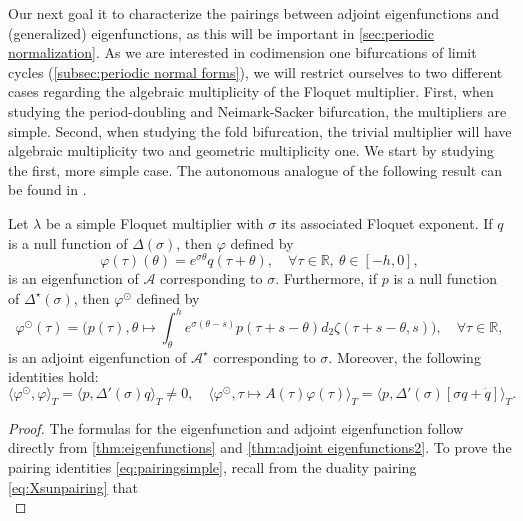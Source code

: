 \documentclass[english]{myarticle}
\begin{document}
\begin{sloppypar}
Our next goal it to characterize the pairings between adjoint eigenfunctions and (generalized) eigenfunctions, as this will be important in \cref{sec:periodic normalization}. As we are interested in codimension one bifurcations of limit cycles (\cref{subsec:periodic normal forms}), we will restrict ourselves to two different cases regarding the algebraic multiplicity of the Floquet multiplier. First, when studying the period-doubling and Neimark-Sacker bifurcation, the multipliers are simple. Second, when studying the fold bifurcation, the trivial multiplier will have algebraic multiplicity two and geometric multiplicity one. We start by studying the first, more simple case. The autonomous analogue of the following result can be found in \cite[Corollary IV.5.12]{Diekmann1995}.
\begin{proposition} \label{prop:pairing}
Let $\lambda$ be a simple Floquet multiplier with $\sigma$ its associated Floquet exponent. If $q$ is a null function of $\Delta(\sigma)$, then $\varphi$ defined by
\begin{equation} \label{eq:simple eig}
    \varphi(\tau)(\theta) = e^{\sigma\theta} q(\tau + \theta), \quad \forall \tau \in \mathbb{R}, \ \theta \in [-h,0],
\end{equation}
is an eigenfunction of $\mathcal{A}$ corresponding to $\sigma$. Furthermore, if $p$ is a null function of $\Delta^\star(\sigma)$, then $\varphi^\odot$ defined by
\begin{equation} \label{eq:adjointsimple}
    \varphi^\odot (\tau) = \bigg(p(\tau), \theta \mapsto \int_\theta^h e^{\sigma(\theta -s)}p(\tau + s - \theta) d_2 \zeta(\tau + s - \theta,s)\bigg), \quad \forall \tau \in \mathbb{R},
\end{equation}
is an adjoint eigenfunction of $\mathcal{A}^\star$ corresponding to $\sigma$. Moreover, the following identities hold:
\begin{equation} \label{eq:pairingsimple}
    \langle \varphi^\odot, \varphi \rangle_T = \langle p, \Delta'(\sigma) q \rangle_T \neq 0, \quad \langle \varphi^\odot, \tau \mapsto A(\tau)\varphi(\tau) \rangle_T = \langle p, \Delta'(\sigma)[\sigma q + \dot{q} ]\rangle_T.
\end{equation}
\begin{proof}
The formulas for the eigenfunction and adjoint eigenfunction follow directly from \cref{thm:eigenfunctions} and \cref{thm:adjoint eigenfunctions2}. To prove the pairing identities \eqref{eq:pairingsimple}, recall from the duality pairing \eqref{eq:Xsunpairing} that
\begin{equation} \label{eq:pairingcomp}

\end{equation}
\end{proof}
\end{proposition}
\end{sloppypar}
\end{document}
